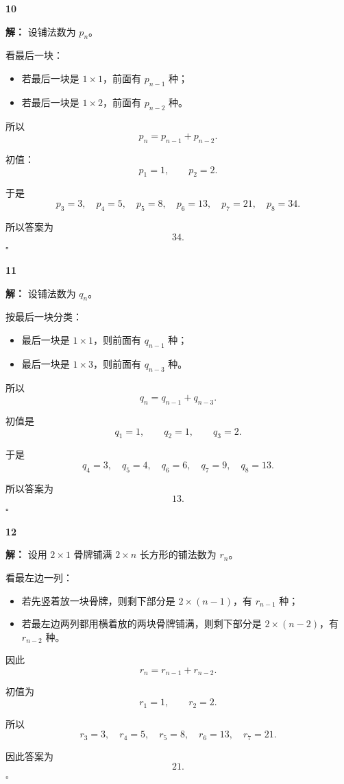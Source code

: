 \documentclass[11pt,a4paper,fontset=fandol]{ctexart}
\theoremstyle{formalexample}
\newenvironment{solution}{\par\noindent\textbf{解：}}{\hfill$\square$\par}
\begin{document}
\textbf{10}\begin{solution}
设铺法数为 $p_n$。

看最后一块：
\begin{itemize}
  \item 若最后一块是 $1\times 1$，前面有 $p_{n-1}$ 种；
  \item 若最后一块是 $1\times 2$，前面有 $p_{n-2}$ 种。
\end{itemize}

所以
\[
  p_n=p_{n-1}+p_{n-2}.
\]

初值：
\[
  p_1=1,
  \qquad
  p_2=2.
\]

于是
\[
  p_3=3,
  \quad
  p_4=5,
  \quad
  p_5=8,
  \quad
  p_6=13,
  \quad
  p_7=21,
  \quad
  p_8=34.
\]

所以答案为
\[
  34.
\]
\end{solution}

\textbf{11}\begin{solution}
设铺法数为 $q_n$。

按最后一块分类：
\begin{itemize}
  \item 最后一块是 $1\times 1$，则前面有 $q_{n-1}$ 种；
  \item 最后一块是 $1\times 3$，则前面有 $q_{n-3}$ 种。
\end{itemize}

所以
\[
  q_n=q_{n-1}+q_{n-3}.
\]

初值是
\[
  q_1=1,
  \qquad
  q_2=1,
  \qquad
  q_3=2.
\]

于是
\[
  q_4=3,
  \quad
  q_5=4,
  \quad
  q_6=6,
  \quad
  q_7=9,
  \quad
  q_8=13.
\]

所以答案为
\[
  13.
\]
\end{solution}

\textbf{12}\begin{solution}
设用 $2\times 1$ 骨牌铺满 $2\times n$ 长方形的铺法数为 $r_n$。

看最左边一列：
\begin{itemize}
  \item 若先竖着放一块骨牌，则剩下部分是 $2\times (n-1)$，有 $r_{n-1}$ 种；
  \item 若最左边两列都用横着放的两块骨牌铺满，则剩下部分是 $2\times (n-2)$，有 $r_{n-2}$ 种。
\end{itemize}

因此
\[
  r_n=r_{n-1}+r_{n-2}.
\]

初值为
\[
  r_1=1,
  \qquad
  r_2=2.
\]

所以
\[
  r_3=3,
  \quad
  r_4=5,
  \quad
  r_5=8,
  \quad
  r_6=13,
  \quad
  r_7=21.
\]

因此答案为
\[
  21.
\]
\end{solution}
\end{document}
